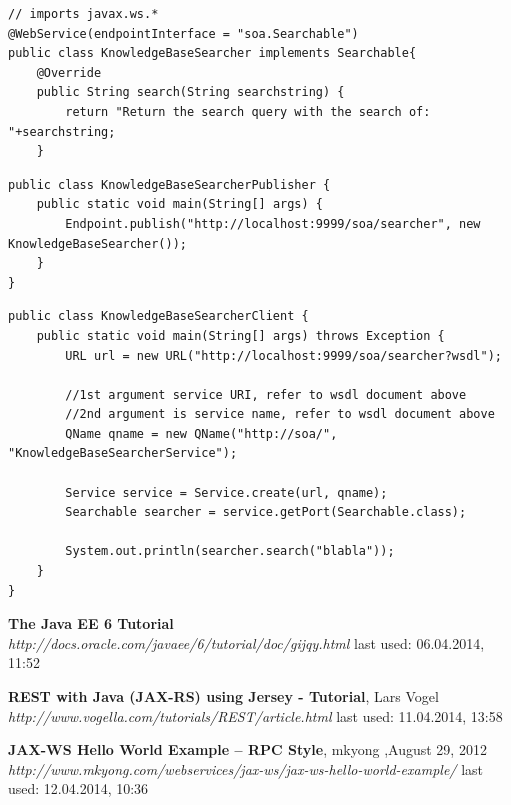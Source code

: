 \documentclass[12pt]{article}
\begin{document}
\begin{lstlisting}[caption=KnowledgeBaseSearcher class, label=KnowledgeBaseSearcher]
// imports javax.ws.*
@WebService(endpointInterface = "soa.Searchable")
public class KnowledgeBaseSearcher implements Searchable{
    @Override
    public String search(String searchstring) {
        return "Return the search query with the search of: "+searchstring;
    }
\end{lstlisting}
\begin{lstlisting}[caption=KnowledgeBaseSearcherPublisher class, label=KnowledgeBaseSearcherPublisher]
public class KnowledgeBaseSearcherPublisher {
    public static void main(String[] args) {
        Endpoint.publish("http://localhost:9999/soa/searcher", new KnowledgeBaseSearcher());
    }
}
\end{lstlisting}
\begin{lstlisting}[caption=KnowledgeBaseSearcherClient class, label=KnowledgeBaseSearcherClient]
public class KnowledgeBaseSearcherClient {
    public static void main(String[] args) throws Exception {
        URL url = new URL("http://localhost:9999/soa/searcher?wsdl");

        //1st argument service URI, refer to wsdl document above
        //2nd argument is service name, refer to wsdl document above
        QName qname = new QName("http://soa/", "KnowledgeBaseSearcherService");

        Service service = Service.create(url, qname);
        Searchable searcher = service.getPort(Searchable.class);

        System.out.println(searcher.search("blabla"));
    }
}
\end{lstlisting}





\newpage
\begin{thebibliography}{56}

   \textbf{The Java EE 6 Tutorial} \\
  \textit{http://docs.oracle.com/javaee/6/tutorial/doc/gijqy.html}
  \newline last used: 06.04.2014, 11:52
  
   \textbf{REST with Java (JAX-RS) using Jersey - Tutorial}, Lars Vogel\\
  \textit{  http://www.vogella.com/tutorials/REST/article.html}
  \newline last used: 11.04.2014, 13:58
  
    
   \textbf{JAX-WS Hello World Example – RPC Style}, mkyong ,August 29, 2012\\
  \textit{  http://www.mkyong.com/webservices/jax-ws/jax-ws-hello-world-example/}
  \newline last used: 12.04.2014, 10:36
  

  
\end{thebibliography}
\end{document}

